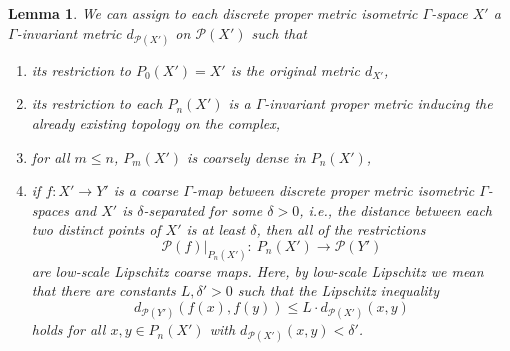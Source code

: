 \documentclass[pdftex]{sigma}
\numberwithin{equation}{section}
\newtheorem{lem}[thm]{Lemma}
\theoremstyle{definition}
\newcommand{\cP}{\mathcal{P}}
\begin{document}
\begin{lem}%
We can assign to each discrete proper metric isometric $\Gamma$-space $X'$ a $\Gamma$-invariant metric $d_{\cP(X')}$ on $\cP(X')$ such that
\begin{enumerate}\itemsep=0pt
\item[$\bullet$] its restriction to $P_0(X')=X'$ is the original metric $d_{X'}$,
\item[$\bullet$] its restriction to each $P_n(X')$ is a $\Gamma$-invariant \emph{proper} metric inducing the already existing topology on the complex,
\item[$\bullet$] for all $m\leq n$, $P_m(X')$ is coarsely dense in $P_n(X')$,
\item[$\bullet$] if $f\colon X'\to Y'$ is a coarse $\Gamma$-map between discrete proper metric isometric $\Gamma$-spaces and $X'$ is $\delta$-separated for some $\delta>0$, i.e., the distance between each two distinct points of $X'$ is at least $\delta$, then all of the restrictions
\[
\cP(f)|_{P_n(X')}\colon\ P_n(X')\to \cP(Y')
\]
are low-scale Lipschitz coarse maps. Here, by low-scale Lipschitz we mean that there are constants $L,\delta'>0$ such that the Lipschitz inequality
\[
d_{\cP(Y')}(f(x),f(y))\leq L\cdot d_{\cP(X')}(x,y)
\]
holds for all $x,y\in P_n(X')$ with $d_{\cP(X')}(x,y)<\delta'$.
\end{enumerate}
\end{lem}
\end{document}
